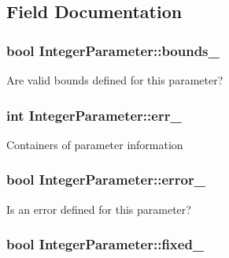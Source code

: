 \subsection{Field Documentation}
\hypertarget{class_integer_parameter_a6f95c4b841a3d669d15c46e787f73153}{
\subsubsection[{bounds\-\_\-}]{\setlength{\rightskip}{0pt plus 5cm}bool Integer\-Parameter\-::bounds\-\_\-\hspace{0.3cm}{\ttfamily [protected]}}}\label{class_integer_parameter_a6f95c4b841a3d669d15c46e787f73153}
Are valid bounds defined for this parameter? \hypertarget{class_integer_parameter_a713ac37a8c8d820e212881178719ae91}{
\subsubsection[{err\-\_\-}]{\setlength{\rightskip}{0pt plus 5cm}int Integer\-Parameter\-::err\-\_\-\hspace{0.3cm}{\ttfamily [protected]}}}\label{class_integer_parameter_a713ac37a8c8d820e212881178719ae91}
Containers of parameter information \hypertarget{class_integer_parameter_a611862af84b9db773cf8690fb0f888fb}{
\subsubsection[{error\-\_\-}]{\setlength{\rightskip}{0pt plus 5cm}bool Integer\-Parameter\-::error\-\_\-\hspace{0.3cm}{\ttfamily [protected]}}}\label{class_integer_parameter_a611862af84b9db773cf8690fb0f888fb}
Is an error defined for this parameter? \hypertarget{class_integer_parameter_a7a3f5d9413ccb5fd1814a7db9e77dcfc}{
\subsubsection[{fixed\-\_\-}]{\setlength{\rightskip}{0pt plus 5cm}bool Integer\-Parameter\-::fixed\-\_\-\hspace{0.3cm}{\ttfamily [protected]}}}\label{class_integer_parameter_a7a3f5d9413ccb5fd1814a7db9e77dcfc}
